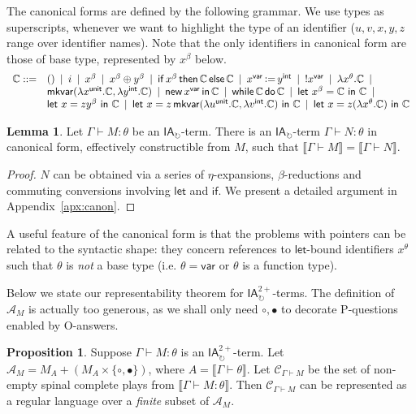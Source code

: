 \documentclass{CSML}
\theoremstyle{definition}\newtheorem{definition}[thm]{Definition}
\theoremstyle{definition}\newtheorem{example}[thm]{Example}
\theoremstyle{definition}\newtheorem{proposition}[thm]{Proposition}
\theoremstyle{definition}\newtheorem{lemma}[thm]{Lemma}
\theoremstyle{definition}\newtheorem{theorem}[thm]{Theorem}
\theoremstyle{definition}\newtheorem{corollary}[thm]{Corollary}
\theoremstyle{definition}\newtheorem{remark}[thm]{Remark}
\newcommand\clg[1]{\mathcal{#1}}
\newcommand\comp[1]{\mathcal{C}_{#1}}
\newcommand\ialoop{\mathsf{IA}_{\circlearrowright}}
\newcommand\iatwo{\ialoop^{2+}}
\newcommand\letin[2]{\mathsf{let}\ #1\ \mathsf{in}\ #2}
\newcommand\badvar[2]{\mathsf{mkvar}(#1,#2)}
\newcommand{\aasg}{\,\raisebox{0.065ex}{:}{=}\,}
\newcommand\comt{\mathsf{unit}}
\newcommand\expt{\mathsf{int}}
\newcommand\vart{\mathsf{var}}
\newcommand\while[2]{\mathsf{while}\,#1\,\mathsf{do}\,#2}
\newcommand\cond[3]{\mathsf{if}\,#1\,\mathsf{then}\,#2\,\mathsf{else}\,#3}
\newcommand\cutout[1]{}
\newcommand\sem[1]{\llbracket #1 \rrbracket}
\newcommand\seq[2]{{#1} \vdash {#2}}
\newcommand\new[2]{\mathsf{new}\,#1\,\mathsf{in}\,#2}
\newcommand\can{\mathbb{C}}
\begin{document}
The canonical forms are defined by the following grammar. We use types as 
superscripts, whenever we want to highlight the type of an identifier ($u,v,x,y,z$ 
range over identifier names). Note that the only identifiers in canonical form are those of base type, 
represented by  $x^\beta$ below.
\[\begin{array}{ll}
\can ::=   & ()  \,\,\,|\,\,\, i \,\,\,|\,\,\, x^\beta \,\,\,|\,\,\, x^\beta\oplus y^\beta \,\,\,|\,\,\, \cond{x^\beta}{\can}{\can} \,\,\,|\,\,\, 
x^\vart\aasg y^\expt \,\,\,|\,\,\, !x^\vart \,\,\,|\,\,\,\lambda x^\theta.\can \,\,\,|\,\,\,\\
 & \badvar{\lambda x^\comt.\can}{\lambda y^\expt.\can} \,\,\,|\,\,\,  \new{x^\vart}{\can} \,\,\,|\,\,\, \while{\can}{\can}  \,\,\,|\,\,\, \letin{x^\beta=\can}{\can} \,\,\,|\,\,\,\\ 
& \letin{x= z y^\beta}{\can} \,\,\,|\,\,\, 
\letin{x= z\, \badvar{\lambda u^\comt.\can}{\lambda v^\expt.\can}}{\can} \,\,\,|\,\,\,
\letin{x=z(\lambda x^\theta.\can)}{\can}
\end{array}\]
\begin{lemma}\label{lem:canon}
Let $\seq{\Gamma}{M:\theta}$ be an $\ialoop$-term. There is
an $\ialoop$-term $\seq{\Gamma}{N:\theta}$ in canonical form, effectively
constructible from $M$, such that $\sem{\seq{\Gamma}{M}}=\sem{\seq{\Gamma}{N}}$.
\end{lemma}
\begin{proof}
$N$ can be obtained via a series of $\eta$-expansions, $\beta$-reductions and
commuting conversions involving $\mathsf{let}$ and $\mathsf{if}$. We present a detailed argument in Appendix~\ref{apx:canon}.
\end{proof}
A useful feature of the canonical form is that the problems with pointers 
can be related to the syntactic shape: they concern references to $\mathsf{let}$-bound identifiers $x^\theta$
such that $\theta$ is \emph{not} a base type (i.e. $\theta=\vart$ or $\theta$ is a function type).
\cutout{The representation scheme for pointers corresponds then to enumerating such $\mathsf{let}$ bindings
along branches of the syntactic tree of the canonical form (using $0$ for topmost bindings).}
Below we state our representability theorem for $\iatwo$-terms.
The definition of $\clg{A}_M$ is actually too generous, as we shall only need $\circ,\bullet$ to
decorate P-questions enabled by O-answers.
\begin{proposition}\label{prop:regular}
Suppose $\seq{\Gamma}{M:\theta}$ is an $\iatwo$-term. Let $\clg{A}_M=M_A+(M_A\times\{\circ,\bullet\})$, 
where $A=\sem{\seq{\Gamma}{\theta}}$.
Let $\comp{\seq{\Gamma}{M}}$ be the set of non-empty spinal complete plays from $\sem{\seq{\Gamma}{M:\theta}}$.
Then $\comp{\seq{\Gamma}{M}}$ can be represented as a regular language over a \emph{finite} subset of $\clg{A}_M$.
\end{proposition}
\end{document}
